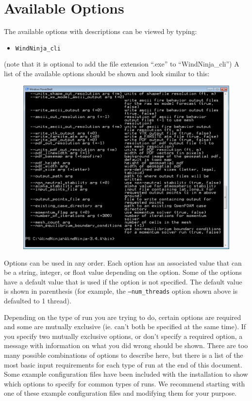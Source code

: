 \documentclass[12pt]{article}
\begin{document}
\section*{Available Options}
The available options with descriptions can be viewed by typing:
\begin{itemize}
\item[]\texttt{WindNinja\_cli} 
\end{itemize}
(note that it is optional to add the file extension “.exe” to “WindNinja\_cli”)
A list of the available options should be shown and look similar to this:
\begin{figure}[H]
	\centering
	\label{}
	\includegraphics[scale=0.6]{cli-1}
\end{figure}

Options can be used in any order.  Each option has an associated value that can be a string, integer, or float value depending on the option.  Some of the options have a default value that is used if the option is not specified.  The default value is shown in parenthesis (for example,  the \texttt{--num\_threads} option shown above is defaulted to 1 thread).

Depending on the type of run you are trying to do, certain options are required and some are mutually exclusive (ie. can't both be specified at the same time).  If you specify two mutually exclusive options, or don't specify a required option, a message with information on what you did wrong should be shown.  There are too many possible combinations of options to describe here, but there is a list of the most basic input requirements for each type of run at the end of this document. Some example configuration files have been included with the installation to show which options to specify for common types of runs.  We recommend starting with one of these example configuration files and modifying them for your purpose.
\newpage
\end{document}
